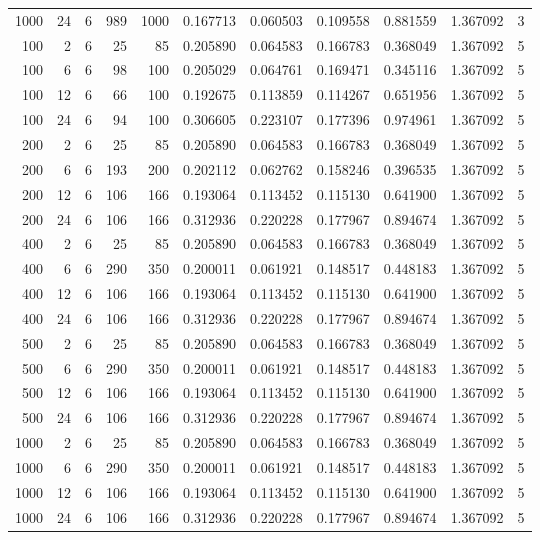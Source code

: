 \begin{table}
\begin{tabular}{rrrrrrrrrrr}
1000 & 24 & 6 & 989 & 1000 & 0.167713 & 0.060503 & 0.109558 & 0.881559 & 1.367092 & 3 \\
100 & 2 & 6 & 25 & 85 & 0.205890 & 0.064583 & 0.166783 & 0.368049 & 1.367092 & 5 \\
100 & 6 & 6 & 98 & 100 & 0.205029 & 0.064761 & 0.169471 & 0.345116 & 1.367092 & 5 \\
100 & 12 & 6 & 66 & 100 & 0.192675 & 0.113859 & 0.114267 & 0.651956 & 1.367092 & 5 \\
100 & 24 & 6 & 94 & 100 & 0.306605 & 0.223107 & 0.177396 & 0.974961 & 1.367092 & 5 \\
200 & 2 & 6 & 25 & 85 & 0.205890 & 0.064583 & 0.166783 & 0.368049 & 1.367092 & 5 \\
200 & 6 & 6 & 193 & 200 & 0.202112 & 0.062762 & 0.158246 & 0.396535 & 1.367092 & 5 \\
200 & 12 & 6 & 106 & 166 & 0.193064 & 0.113452 & 0.115130 & 0.641900 & 1.367092 & 5 \\
200 & 24 & 6 & 106 & 166 & 0.312936 & 0.220228 & 0.177967 & 0.894674 & 1.367092 & 5 \\
400 & 2 & 6 & 25 & 85 & 0.205890 & 0.064583 & 0.166783 & 0.368049 & 1.367092 & 5 \\
400 & 6 & 6 & 290 & 350 & 0.200011 & 0.061921 & 0.148517 & 0.448183 & 1.367092 & 5 \\
400 & 12 & 6 & 106 & 166 & 0.193064 & 0.113452 & 0.115130 & 0.641900 & 1.367092 & 5 \\
400 & 24 & 6 & 106 & 166 & 0.312936 & 0.220228 & 0.177967 & 0.894674 & 1.367092 & 5 \\
500 & 2 & 6 & 25 & 85 & 0.205890 & 0.064583 & 0.166783 & 0.368049 & 1.367092 & 5 \\
500 & 6 & 6 & 290 & 350 & 0.200011 & 0.061921 & 0.148517 & 0.448183 & 1.367092 & 5 \\
500 & 12 & 6 & 106 & 166 & 0.193064 & 0.113452 & 0.115130 & 0.641900 & 1.367092 & 5 \\
500 & 24 & 6 & 106 & 166 & 0.312936 & 0.220228 & 0.177967 & 0.894674 & 1.367092 & 5 \\
1000 & 2 & 6 & 25 & 85 & 0.205890 & 0.064583 & 0.166783 & 0.368049 & 1.367092 & 5 \\
1000 & 6 & 6 & 290 & 350 & 0.200011 & 0.061921 & 0.148517 & 0.448183 & 1.367092 & 5 \\
1000 & 12 & 6 & 106 & 166 & 0.193064 & 0.113452 & 0.115130 & 0.641900 & 1.367092 & 5 \\
1000 & 24 & 6 & 106 & 166 & 0.312936 & 0.220228 & 0.177967 & 0.894674 & 1.367092 & 5 \\

\end{tabular}
\end{table}
